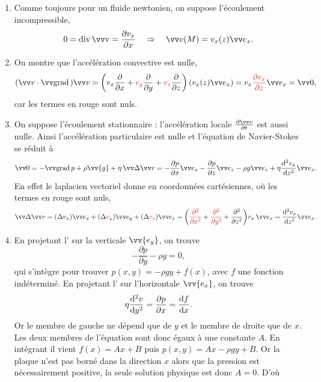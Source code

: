 \documentclass[12pt,fancy]{cours}
\begin{document}
\begin{enumerate}
	\item  Comme toujours pour un fluide newtonien, on suppose l’écoulement incompressible,
\begin{equation}
	0 = \Dive{\Vec{v}} = \dr{v_x}{x} \Rar \Vec{v}(M) = v_x(z)\ex.
\end{equation}
\item On montre que l'accélération convective est nulle,
\begin{equation}
	(\Vec{v}\cdot \Grad{})\Vec{v} = \left(v_x \dr{}{x}+\JRouge{v_y} \dr{}{y}+\JRouge{v_z} \dr{}{z}\right)(v_x(z)\ex) = v_x \JRouge{\dr{v_x}{z}}\ex = \Vec{0},
\end{equation}
car les termes en rouge sont nuls.
\item On suppose l’écoulement stationnaire : l’accélération locale $\dr{\Vec{v}}{t}$ est aussi nulle. Ainsi l'accélération particulaire est nulle et l'équation de Navier-Stokes se réduit à
\begin{equation}\label{eq:ns}
\Vec{0} = -\grad{p}+\rho\vv{g}+\eta\,\Deltav{v} = -\dr{p}{x}\ex - \dr{p}{z}\ez - \rho g \ez + \eta \ddd{v_x}{z} \ex.
\end{equation}
En effet le laplacien vectoriel donne en coordonnées cartésiennes, où les termes en rouge sont nuls,
\begin{equation}
\Deltav{v} = (\Delta v_x)\ex + (\Delta \JRouge{v_y})\ey + (\Delta \JRouge{v_z})\ez = \left(\JRouge{\ddr{}{x}}  + \JRouge{\ddr{}{y}} + \ddr{}{z}\right)\!v_x\, \ex = \ddd{v_x}{z} \ex.
\end{equation}


\item
En projetant l’ sur la verticale $\vv{e_y}$, on trouve
\begin{equation}
-\dfrac{\partial p}{\partial y}-\rho g = 0,
\end{equation}
qui s’intègre pour trouver $p(x,y)=-\rho g y+f(x)$, avec $f$ une fonction indéterminé.  En projetant  l’ sur l’horizontale $\vv{e_x}$, on trouve
\begin{equation}\label{eq:vcouette}
\eta\frac{\mathrm{d}^{2} v}{\mathrm{d} y^2} = \dfrac{\partial p}{\partial x} = \frac{\mathrm{d} f}{\mathrm{d} x}.
\end{equation}
Or le membre de gauche ne dépend que de $y$ et le membre de droite que de $x$. Les deux membres de l’équation sont donc égaux à une constante $A$. En intégrant il vient $f(x)=Ax+B$ puis $p(x,y)=Ax-\rho g y+B$. Or la plaque n'est pas borné dans la direction $x$ alors que la pression est nécessairement positive, la seule solution physique est donc $A=0$. D'où


\end{enumerate}
\end{document}
